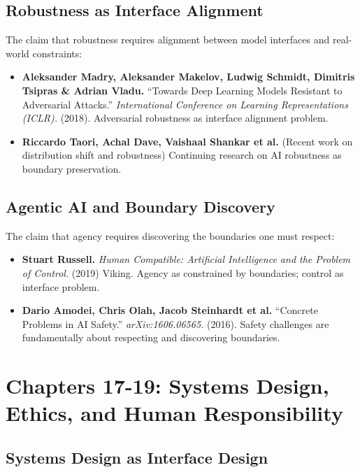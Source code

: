 \documentclass[
  openright]{book}
\begin{document}
\subsection{Robustness as Interface
Alignment}\label{robustness-as-interface-alignment-1}

The claim that robustness requires alignment between model interfaces
and real-world constraints:

\begin{itemize}
\item
  \textbf{Aleksander Madry, Aleksander Makelov, Ludwig Schmidt, Dimitris
  Tsipras \& Adrian Vladu.} ``Towards Deep Learning Models Resistant to
  Adversarial Attacks.'' \emph{International Conference on Learning
  Representations (ICLR).} (2018). Adversarial robustness as interface
  alignment problem.
\item
  \textbf{Riccardo Taori, Achal Dave, Vaishaal Shankar et al.} (Recent
  work on distribution shift and robustness) Continuing research on AI
  robustness as boundary preservation.
\end{itemize}

\subsection{Agentic AI and Boundary
Discovery}\label{agentic-ai-and-boundary-discovery-1}

The claim that agency requires discovering the boundaries one must
respect:

\begin{itemize}
\item
  \textbf{Stuart Russell.} \emph{Human Compatible: Artificial
  Intelligence and the Problem of Control.} (2019) Viking. Agency as
  constrained by boundaries; control as interface problem.
\item
  \textbf{Dario Amodei, Chris Olah, Jacob Steinhardt et al.} ``Concrete
  Problems in AI Safety.'' \emph{arXiv:1606.06565.} (2016). Safety
  challenges are fundamentally about respecting and discovering
  boundaries.
\end{itemize}

\section{Chapters 17-19: Systems Design, Ethics, and Human
Responsibility}\label{chapters-17-19-systems-design-ethics-and-human-responsibility}

\subsection{Systems Design as Interface
Design}\label{systems-design-as-interface-design-1}
\end{document}
